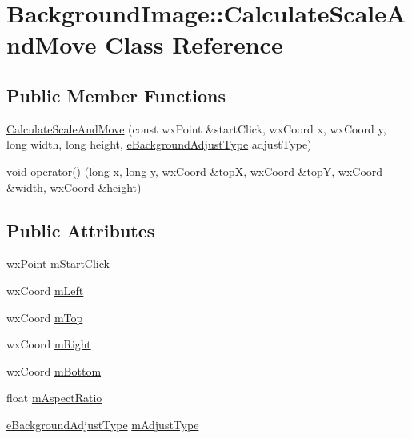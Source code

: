 \hypertarget{a00026}{\section{Background\-Image\-:\-:Calculate\-Scale\-And\-Move Class Reference}
\label{a00026}
}
\subsection*{Public Member Functions}
\begin{DoxyCompactItemize}
\item 
\hyperlink{a00026_acdc1b3f9e19c9c7df4ab4c8b5ef3ba83}{Calculate\-Scale\-And\-Move} (const wx\-Point \&start\-Click, wx\-Coord x, wx\-Coord y, long width, long height, \hyperlink{a00017_a3927289a3b88bbf9320c2dfe3271c1ae}{e\-Background\-Adjust\-Type} adjust\-Type)
\item 
void \hyperlink{a00026_a5d5b2066e9e55332cef810e5220e7171}{operator()} (long x, long y, wx\-Coord \&top\-X, wx\-Coord \&top\-Y, wx\-Coord \&width, wx\-Coord \&height)
\end{DoxyCompactItemize}
\subsection*{Public Attributes}
\begin{DoxyCompactItemize}
\item 
wx\-Point \hyperlink{a00026_abfc1d7e1dedf3cd3849b801b5359fd6f}{m\-Start\-Click}
\item 
wx\-Coord \hyperlink{a00026_a6cb63ace64accd5ac8c3a829a3cb64bc}{m\-Left}
\item 
wx\-Coord \hyperlink{a00026_a906cd5b5471e32132eb3ae4e7662f641}{m\-Top}
\item 
wx\-Coord \hyperlink{a00026_a5559ceef31f1942d05452e2f6f17cfb8}{m\-Right}
\item 
wx\-Coord \hyperlink{a00026_a694323b8aa12e93f816074d8e15bf665}{m\-Bottom}
\item 
float \hyperlink{a00026_abd99704a6e867545436f7c16e483d585}{m\-Aspect\-Ratio}
\item 
\hyperlink{a00017_a3927289a3b88bbf9320c2dfe3271c1ae}{e\-Background\-Adjust\-Type} \hyperlink{a00026_a65984a6ed965e2c524a76831d08ac3bd}{m\-Adjust\-Type}
\end{DoxyCompactItemize}


